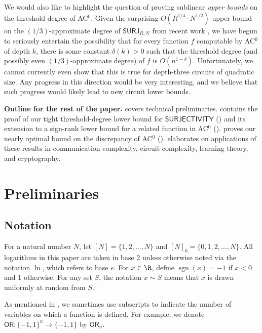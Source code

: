 \documentclass{toc}
\newcommand{\sgn}{\mathrm{sign}}
\newcommand{\SURJ}{\mathsf{ SURJ}}
\newcommand{\OR}{\mathsf{ OR}}
\newcommand{\bits}{\{-1,1\}}
\renewcommand{\sgn}{\operatorname{sgn}}
\begin{document}
\medskip

We would also like to highlight the question of proving sublinear \emph{upper bounds} on the threshold degree of AC$^0$. 
Given the surprising $O(R^{1/4} \cdot N^{1/2})$ upper bound on the $(1/3)$-approximate degree of $\SURJ_{R, N}$ from
recent %
work %
\cite{algopoly, bkt}, we have begun to seriously entertain the possibility that for every function $f$ computable by AC$^0$ of depth $k$, there is some constant $\delta(k)>0$ such that the threshold degree (and possibly even $(1/3)$-approximate degree) of $f$ is $O(n^{1-\delta})$. 
Unfortunately, we cannot currently even show that this is true for 
depth-three %
circuits of quadratic size. Any progress in this direction would be very interesting,
and we believe that such progress would likely lead to new circuit lower bounds.


\medskip \noindent \textbf{Outline for the rest of the paper.}
 covers technical preliminaries. 
contains the proof of our tight threshold-degree %
lower bound for $\mathsf{SURJECTIVITY}$ ()
and its extension to a sign-rank lower bound for a related function in AC$^0$ (). 
 proves our nearly optimal bound on the discrepancy of AC$^0$ ().
 elaborates on applications of these results in communication complexity, circuit complexity, learning theory, and cryptography.

\section{Preliminaries}
\label{sec:prelims}
\subsection{Notation}
For a natural number $N$, let $[N] = \{1, 2, \dots, N\}$ and $[N]_0 = \{0, 1, 2, \dots, N\}$. All logarithms in this paper are taken in base $2$ unless otherwise noted via
the notation $\ln$, which refers to base $e$. 
For $x \in \R$, define $\sgn(x) = -1$ if $x < 0$ and 1 otherwise. For any set $S$, the notation $x \sim S$ means
that $x$ is drawn uniformly at random from $S$. 

As mentioned in , we sometimes use subscripts to indicate the number of variables on which a function is defined. 
For example, we denote $\OR \colon \bits^n \to \bits$ by $\OR_n$.
\end{document}
